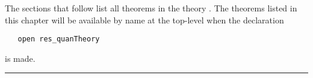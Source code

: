 \label{theorems}

The sections that follow list all theorems in the theory
.  The theorems listed in this chapter will be
available by name at the top-level when the \ML{} declaration
\begin{verbatim}
   open res_quanTheory
\end{verbatim}
is made.

\bigskip
\hrule